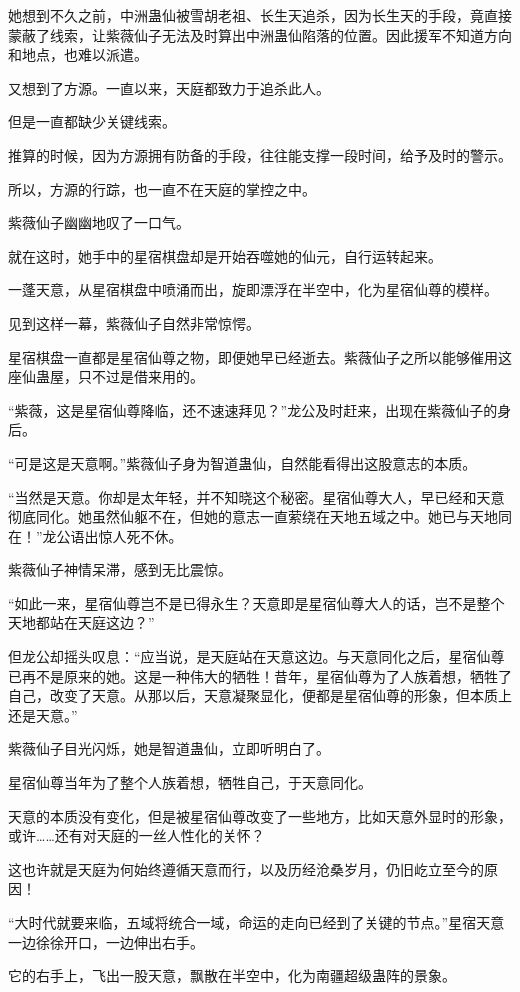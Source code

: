 \begin{this_body}
她想到不久之前，中洲蛊仙被雪胡老祖、长生天追杀，因为长生天的手段，竟直接蒙蔽了线索，让紫薇仙子无法及时算出中洲蛊仙陷落的位置。因此援军不知道方向和地点，也难以派遣。

又想到了方源。一直以来，天庭都致力于追杀此人。

但是一直都缺少关键线索。

推算的时候，因为方源拥有防备的手段，往往能支撑一段时间，给予及时的警示。

所以，方源的行踪，也一直不在天庭的掌控之中。

紫薇仙子幽幽地叹了一口气。

就在这时，她手中的星宿棋盘却是开始吞噬她的仙元，自行运转起来。

一蓬天意，从星宿棋盘中喷涌而出，旋即漂浮在半空中，化为星宿仙尊的模样。

见到这样一幕，紫薇仙子自然非常惊愕。

星宿棋盘一直都是星宿仙尊之物，即便她早已经逝去。紫薇仙子之所以能够催用这座仙蛊屋，只不过是借来用的。

“紫薇，这是星宿仙尊降临，还不速速拜见？”龙公及时赶来，出现在紫薇仙子的身后。

“可是这是天意啊。”紫薇仙子身为智道蛊仙，自然能看得出这股意志的本质。

“当然是天意。你却是太年轻，并不知晓这个秘密。星宿仙尊大人，早已经和天意彻底同化。她虽然仙躯不在，但她的意志一直萦绕在天地五域之中。她已与天地同在！”龙公语出惊人死不休。

紫薇仙子神情呆滞，感到无比震惊。

“如此一来，星宿仙尊岂不是已得永生？天意即是星宿仙尊大人的话，岂不是整个天地都站在天庭这边？”

但龙公却摇头叹息：“应当说，是天庭站在天意这边。与天意同化之后，星宿仙尊已再不是原来的她。这是一种伟大的牺牲！昔年，星宿仙尊为了人族着想，牺牲了自己，改变了天意。从那以后，天意凝聚显化，便都是星宿仙尊的形象，但本质上还是天意。”

紫薇仙子目光闪烁，她是智道蛊仙，立即听明白了。

星宿仙尊当年为了整个人族着想，牺牲自己，于天意同化。

天意的本质没有变化，但是被星宿仙尊改变了一些地方，比如天意外显时的形象，或许……还有对天庭的一丝人性化的关怀？

这也许就是天庭为何始终遵循天意而行，以及历经沧桑岁月，仍旧屹立至今的原因！

“大时代就要来临，五域将统合一域，命运的走向已经到了关键的节点。”星宿天意一边徐徐开口，一边伸出右手。

它的右手上，飞出一股天意，飘散在半空中，化为南疆超级蛊阵的景象。


\end{this_body}
